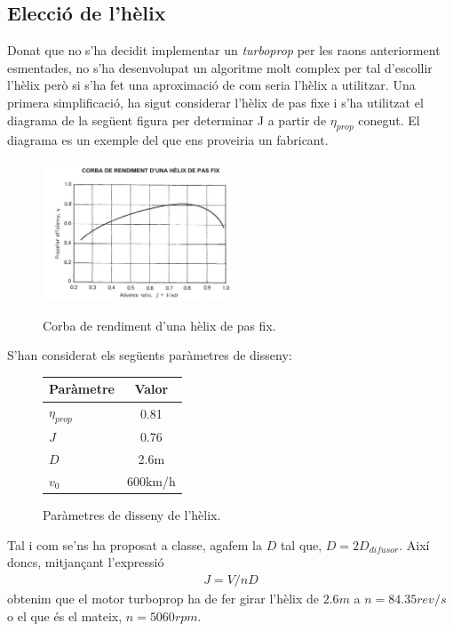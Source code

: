 \subsection{Elecció de l'hèlix}
Donat que no s'ha decidit implementar un \textit{turboprop} per les raons anteriorment esmentades, no s'ha desenvolupat un algoritme molt complex per tal d'escollir l'hèlix però si s'ha fet una aproximació de com seria l'hèlix a utilitzar. Una primera simplificació, ha sigut considerar l'hèlix de pas fixe i s'ha utilitzat el diagrama de la següent figura per determinar J a partir de $\eta_{prop}$ conegut. El diagrama es un exemple del que ens proveiria un fabricant.

\begin{figure}[H]
	\centering
	\includegraphics[width = 0.5\textwidth]{./pics/diag_helix}
	\label{diag_helix}
	\caption{Corba de rendiment d'una hèlix de pas fix.}
\end{figure}

\noindent S'han considerat els següents paràmetres de disseny:
\begin{figure}[H]
	\centering
	\begin{tabular}{lc}
		\toprule[3pt]
		\textbf{Paràmetre}&\textbf{Valor}\\
		\midrule[1pt]
		$\eta_{prop}$ & 0.81\\
		$J$ & 0.76\\
		$D$ & 2.6m\\
		$v_0$&600km/h\\
				
		\bottomrule[2pt]
	\end{tabular}
	\label{helix_param}
	\caption{Paràmetres de disseny de l'hèlix.}
\end{figure}
\noindent Tal i com se'ns ha proposat a classe, agafem la $D$ tal que, $D = 2D_{difusor}$. Així doncs, mitjançant l'expressió 
\begin{align}
	J = V/nD
\end{align}
obtenim que el motor turboprop ha de fer girar l'hèlix de $2.6m$ a \textbf{$n=84.35 rev/s$} o el que és el mateix, \textbf{$n=5060rpm$}.\\

